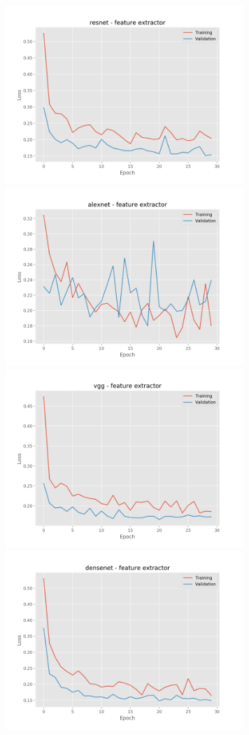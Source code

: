 \documentclass[]{kththesis}
\begin{document}
\printbibliography[heading=bibintoc]

\appendix
  \begin{figure}[h]
    \includegraphics[width=9cm]{b_l_resnet_fe}
    \includegraphics[width=9cm]{b_l_alexnet_fe}
    \includegraphics[width=9cm]{b_l_vgg_fe}
    \includegraphics[width=9cm]{b_l_densenet_fe}

\end{figure}
\end{document}
